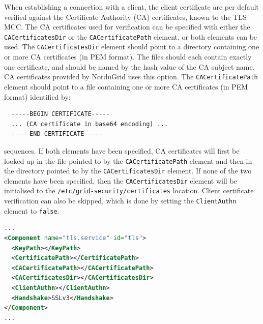 \documentclass{article}
\begin{document}
When establishing a connection with a client, the client certificate are per
default verified against the Certificate Authority (CA) certificates, known to
the TLS MCC. The CA certificates used for verification can be specified with
either the \texttt{CACertificatesDir} or the \texttt{CACertificatePath} element,
or both elements can be used. The \texttt{CACertificatesDir} element should
point to a directory containing one or more CA certificates (in PEM format). The
files should each contain exactly one certificate, and should be named by the
hash value of the CA subject name. CA certificates provided by NorduGrid uses
this option. The \texttt{CACertificatePath} element should point to a file
containing one or more CA certificates (in PEM format) identified by:
\begin{lstlisting}
  -----BEGIN CERTIFICATE-----
  ... (CA certificate in base64 encoding) ...
  -----END CERTIFICATE-----
\end{lstlisting}
sequences. If both elements have been specified, CA certificates will first be
looked up in the file pointed to by the \texttt{CACertificatePath} element and
then in the directory pointed to by the \texttt{CACertificatesDir} element. If
none of the two elements have been specified, then the
\texttt{CACertificatesDir} element will be initialised to the
\texttt{/etc/grid-security/certificates} location. Client certificate
verification can also be skipped, which is done by setting the
\texttt{ClientAuthn} element to \texttt{false}.

\begin{lstlisting}[language=xml]
...
<Component name="tls.service" id="tls">
  <KeyPath></KeyPath>
  <CertificatePath></CertificatePath>
  <CACertificatePath></CACertificatePath>
  <CACertificatesDir></CACertificatesDir>
  <ClientAuthn></ClientAuthn>
  <Handshake>SSLv3</Handshake>
</Component>
...
\end{lstlisting}
\end{document}
